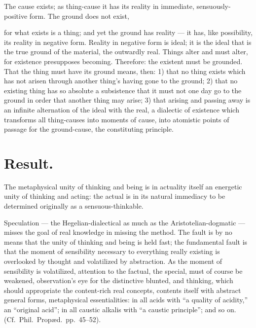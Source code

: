 \documentclass[12pt,a4paper]{book}
\begin{document}
The cause exists; as thing-cause it has its reality in immediate,
sensuously-positive form. The ground does not exist,

for what exists is a thing; and yet the ground has reality --- it has, like
possibility, its reality in negative form. Reality in negative form is ideal;
it is the ideal that is the true ground of the material, the outwardly real.
Things alter and must alter, for existence presupposes becoming. Therefore: the
existent must be grounded. That the thing must have its ground means, then: 1)
that no thing exists which has not arisen through another thing's having gone
to the ground; 2) that no existing thing has so absolute a subsistence that it
must not one day go to the ground in order that another thing may arise; 3)
that arising and passing away is an infinite alternation of the ideal with the
real, a dialectic of existence which transforms all thing-causes into moments
of cause, into atomistic points of passage for the ground-cause, the
constituting principle.

\section*{Result.}

The metaphysical unity of thinking and being is in actuality itself an
energetic unity of thinking and acting: the actual is in its natural immediacy
to be determined originally as a sensuous-thinkable.

Speculation --- the Hegelian-dialectical as much as the
Aristotelian-dogmatic --- misses the goal of real knowledge in missing the
method. The fault is by no means that the unity of thinking and being is held
fast; the fundamental fault is that the moment of sensibility necessary to
everything really existing is overlooked by thought and volatilized by
abstraction. As the moment of sensibility is volatilized, attention to the
factual, the special, must of course be weakened, observation's eye for the
distinctive blunted, and thinking,
which should appropriate the content-rich real concepts, contents itself with
abstract general forms, metaphysical essentialities: in all acids with ``a
quality of acidity,'' an ``original acid''; in all caustic alkalis with ``a
caustic principle''; and so on. (Cf.\ Phil.\ Propæd.\ pp.~45--52).
\end{document}
